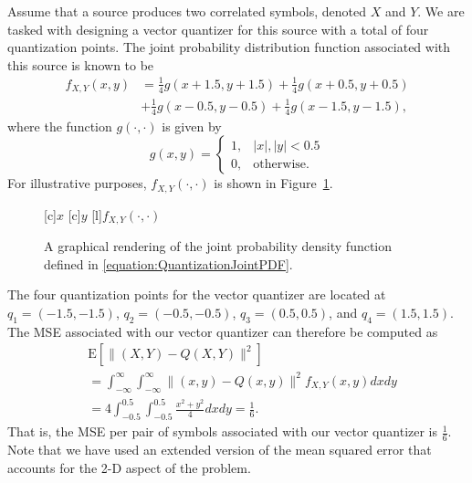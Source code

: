 \begin{example} \label{example:VectorQuantization}
Assume that a source produces two correlated symbols, denoted $X$ and $Y$.
We are tasked with designing a vector quantizer for this source with a total of four quantization points.
The joint probability distribution function associated with this source is known to be
\begin{equation} \label{equation:QuantizationJointPDF}
\begin{split}
f_{X,Y} (x, y) &= \frac{1}{4} g ( x + 1.5, y + 1.5 )
+ \frac{1}{4} g ( x + 0.5, y + 0.5 ) \\
&+ \frac{1}{4} g ( x - 0.5, y - 0.5 )
+ \frac{1}{4} g ( x - 1.5, y - 1.5 ) ,
\end{split}
\end{equation}
where the function $g(\cdot, \cdot)$ is given by
\begin{equation*}
g(x, y) = \begin{cases} 1, &  |x|, |y| < 0.5 \\
0, & \text{otherwise}. \end{cases}
\end{equation*}
For illustrative purposes, $f_{X,Y} (\cdot, \cdot)$ is shown in Figure~\ref{figure:VectorQuantization}.
\begin{figure}[htbp]
\begin{center}
\begin{psfrags}
[c]{$x$}
[c]{$y$}
[l]{$f_{X,Y}(\cdot, \cdot)$}
\end{psfrags}
\caption{A graphical rendering of the joint probability density function defined in \eqref{equation:QuantizationJointPDF}.}
\label{figure:VectorQuantization}
\end{center}
\end{figure}
The four quantization points for the vector quantizer are located at $q_1 = (-1.5, -1.5)$, $q_2 = (-0.5, -0.5)$, $q_3 = (0.5, 0.5)$, and $q_4 = (1.5, 1.5)$.
The MSE associated with our vector quantizer can therefore be computed as
\begin{equation*}
\begin{split}
&\mathrm{E} \left[ \| (X,Y) - Q(X,Y) \|^2 \right] \\
&= \int_{-\infty}^{\infty} \int_{-\infty}^{\infty}
\| (x, y) - Q(x, y) \|^2 f_{X,Y}(x,y) dx dy \\
&= 4 \int_{-0.5}^{0.5} \int_{-0.5}^{0.5} \frac{x^2 + y^2}{4} dx dy
= \frac{1}{6} .
\end{split}
\end{equation*}
That is, the MSE per pair of symbols associated with our vector quantizer is $\frac{1}{6}$.
Note that we have used an extended version of the mean squared error that accounts for the 2-D aspect of the problem.


\end{example}
